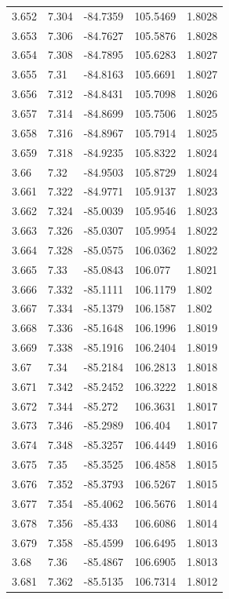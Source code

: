 \begin{tabular}{lllll}
3.652 & 7.304 & -84.7359 & 105.5469 & 1.8028 \\
3.653 & 7.306 & -84.7627 & 105.5876 & 1.8028 \\
3.654 & 7.308 & -84.7895 & 105.6283 & 1.8027 \\
3.655 & 7.31 & -84.8163 & 105.6691 & 1.8027 \\
3.656 & 7.312 & -84.8431 & 105.7098 & 1.8026 \\
3.657 & 7.314 & -84.8699 & 105.7506 & 1.8025 \\
3.658 & 7.316 & -84.8967 & 105.7914 & 1.8025 \\
3.659 & 7.318 & -84.9235 & 105.8322 & 1.8024 \\
3.66 & 7.32 & -84.9503 & 105.8729 & 1.8024 \\
3.661 & 7.322 & -84.9771 & 105.9137 & 1.8023 \\
3.662 & 7.324 & -85.0039 & 105.9546 & 1.8023 \\
3.663 & 7.326 & -85.0307 & 105.9954 & 1.8022 \\
3.664 & 7.328 & -85.0575 & 106.0362 & 1.8022 \\
3.665 & 7.33 & -85.0843 & 106.077 & 1.8021 \\
3.666 & 7.332 & -85.1111 & 106.1179 & 1.802 \\
3.667 & 7.334 & -85.1379 & 106.1587 & 1.802 \\
3.668 & 7.336 & -85.1648 & 106.1996 & 1.8019 \\
3.669 & 7.338 & -85.1916 & 106.2404 & 1.8019 \\
3.67 & 7.34 & -85.2184 & 106.2813 & 1.8018 \\
3.671 & 7.342 & -85.2452 & 106.3222 & 1.8018 \\
3.672 & 7.344 & -85.272 & 106.3631 & 1.8017 \\
3.673 & 7.346 & -85.2989 & 106.404 & 1.8017 \\
3.674 & 7.348 & -85.3257 & 106.4449 & 1.8016 \\
3.675 & 7.35 & -85.3525 & 106.4858 & 1.8015 \\
3.676 & 7.352 & -85.3793 & 106.5267 & 1.8015 \\
3.677 & 7.354 & -85.4062 & 106.5676 & 1.8014 \\
3.678 & 7.356 & -85.433 & 106.6086 & 1.8014 \\
3.679 & 7.358 & -85.4599 & 106.6495 & 1.8013 \\
3.68 & 7.36 & -85.4867 & 106.6905 & 1.8013 \\
3.681 & 7.362 & -85.5135 & 106.7314 & 1.8012 \\

\end{tabular}
